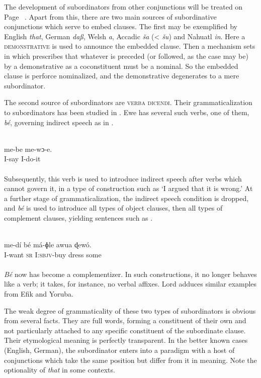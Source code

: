 The development of subordinators from other conjunctions will be treated on Page~\pageref{page70}\chk%
 . Apart from this, there are two main sources of subordinative conjunctions which serve to embed clauses. The first may be exemplified by English \textit{that}, German \textit{daß}, Welsh \textit{a}, Accadic \textit{ša} ({\textless} \textit{šu}) and Nahuatl \textit{in}. Here a \textsc{demonstrative} is used to announce the embedded clause. Then a mechanism sets in which prescribes that whatever is preceded (or followed, as the case may be) by a demonstrative as a coconstituent must be a nominal. So the embedded clause is perforce nominalized, and the demonstrative degenerates to a mere subordinator.

The second source of subordinators are \textsc{verba dicendi}. Their grammaticalization to subordinators has been studied in \citet{Lord1976}. Ewe has several such verbs, one of them, \textit{bé}, governing indirect speech as in .

\ea\label{ex:E26}
\\
\gll me-be 
 me-wɔ-e.\\
 I-say  I-do-it\\
\\
\z
\noindent Subsequently, this verb is used to introduce indirect speech after verbs which cannot govern it, in a type of construction such as ‘I argued that it is wrong.’ At a further stage of grammaticalization, the indirect speech condition is dropped, and \textit{bé} is used to introduce all types of object clauses, then all types of complement clauses, yielding sentences such as .

\ea\label{ex:E27}
\\
\gll me-dí  bé  má-ɸle  awua  ɖewó.\\
 I-want  \textsc{sr}  I:\textsc{sbjv}-buy  dress  some\\
\\
\z
\noindent \textit{Bé} now has become a complementizer. In such constructions, it no longer behaves like a verb; it takes, for instance, no verbal affixes. Lord adduces similar examples from Efik and Yoruba.

The weak degree of grammaticality of these two types of subordinators is obvious from several facts. They are full words, forming a constituent of their own and not particularly attached to any specific constituent of the subordinate clause. Their etymological meaning is perfectly transparent. In the better known cases (English, German), the subordinator enters into a paradigm with a host of conjunctions which take the same position but differ from it in meaning. Note the optionality of \textit{that} in some contexts.

